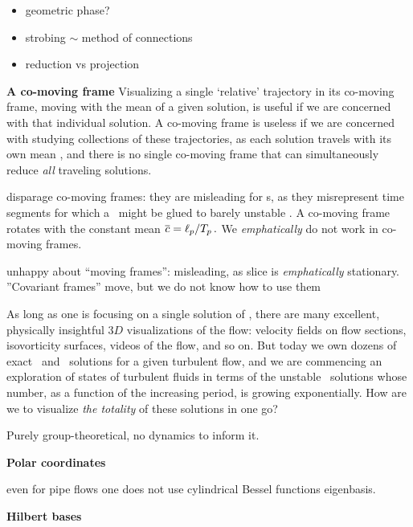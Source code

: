 \documentclass[aip,cha,reprint,
secnumarabic,
nofootinbib, tightenlines,
nobibnotes, showkeys, showpacs,
]{revtex4-1}
\begin{document}
{\begin{itemize}
      \item geometric phase?

  \item strobing $\sim$ method of connections

  \item reduction vs projection
    \end{itemize}
    \color{black}\fi


{\bf A co-moving frame}
Visualizing a single `relative' trajectory in its co-moving frame, moving with
the mean {\phaseVel} of a given solution, is useful if we are
concerned with that individual solution.
A co-moving frame is useless if
we are concerned with studying collections of these trajectories, as each
solution travels with its own mean {\phaseVel}, and there is no single
co-moving frame that can simultaneously reduce \emph{all} traveling
solutions.

disparage co-moving frames: they are misleading for \rpo s, as they
    misrepresent time segments for which a \po\ might be glued to
    barely unstable \eqv. A co-moving frame rotates with the constant
    mean
    $\overline{c}= \ell_p/{T_{p}}
    \,.
    $ We \emph{emphatically} do not work in
    co-moving frames.

unhappy about ``moving frames'': misleading, as slice is
     \emph{emphatically} stationary. ''Covariant frames'' move, but we
     do not know how to use them

    As long as one is focusing on a single solution of \NSe, there are many
    excellent, physically insightful $3D$ visualizations of the flow:
    velocity fields on flow sections, isovorticity surfaces, videos of the
    flow, and so on. But today we own dozens of exact \eqv\ and \reqv\
    solutions for a given turbulent flow, and we are commencing an exploration of
    states of turbulent fluids in terms of the unstable \po\ solutions whose
    number, as a function of the increasing period, is growing exponentially.
    How are we to visualize \emph{the totality} of these solutions in one go?


Purely group-theoretical, no dynamics to inform it.

{\bf Polar coordinates}

even for pipe flows one does not use cylindrical Bessel functions
eigenbasis.

{\bf Hilbert bases}

}
\end{document}
